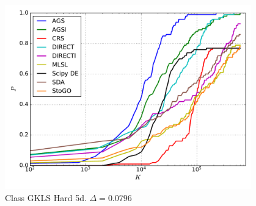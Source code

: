 \documentclass[a4paper]{article}
\begin{document}
\begin{figure}[H]
  \center
  \includegraphics[width=0.95\textwidth]{../experiments/gklsh5d_serg/cmc.pdf}
  \caption{Class GKLS Hard 5d. $\Delta=0.0796$}

\end{figure}

\end{document}
